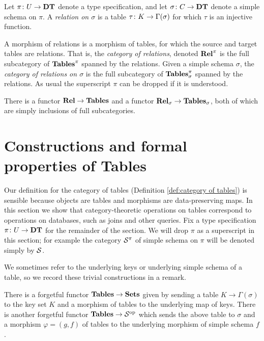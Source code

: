 \documentclass{amsart}
\begin{document}
\begin{definition}\label{def:relational table}

Let $\pi\colon U\rightarrow{\bf DT}$ denote a type specification, and let $\sigma\colon C\rightarrow{\bf DT}$ denote a simple schema on $\pi$.  A {\em relation on $\sigma$} is a table $\tau\colon K\rightarrow\Gamma(\sigma)$ for which $\tau$ is an injective function.  

A morphism of relations is a morphism of tables, for which the source and target tables are relations.  That is, the {\em category of relations}, denoted ${\bf Rel}^\pi$ is the full subcategory of ${\bf Tables}^\pi$ spanned by the relations.  Given a simple schema $\sigma$, the {\em category of relations on $\sigma$} is the full subcategory of ${\bf Tables}^\pi_\sigma$ spanned by the relations.  As usual the superscript $\pi$ can be dropped if it is understood.

There is a functor ${\bf Rel}\rightarrow{\bf Tables}$ and a functor ${\bf Rel}_\sigma\rightarrow{\bf Tables}_\sigma$, both of which are simply inclusions of full subcategories.

\end{definition}

\section{Constructions and formal properties of Tables}\label{sec:constructions for tables}

\setcounter{subsection}{1}

Our definition for the category of tables (Definition \ref{def:category of tables}) is sensible because objects are tables and morphisms are data-preserving maps.  In this section we show that category-theoretic operations on tables correspond to operations on databases, such as joins and other queries.  Fix a type specification $\pi\colon U\rightarrow{\bf DT}$ for the remainder of the section.  We will drop $\pi$ as a superscript in this section; for example the category $\mathcal{S}^\pi$ of simple schema on $\pi$ will be denoted simply by $\mathcal{S}$.

We sometimes refer to the underlying keys or underlying simple schema of a table, so we record these trivial constructions in a remark.

\begin{remark}\label{rem:forget}

There is a forgetful functor ${\bf Tables}\rightarrow{\bf Sets}$ given by sending a table $K\to\Gamma(\sigma)$ to the key set $K$ and a morphism of tables to the underlying map of keys.  There is another forgetful functor ${\bf Tables}\rightarrow\mathcal{S}^\textnormal{op}$ which sends the above table to $\sigma$ and a morphism $\varphi=(g,f)$ of tables to the underlying morphism of simple schema $f$.

\end{remark}
\end{document}
